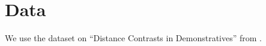 \documentclass[a4paper]{article}
\begin{document}
\section{Data}

We use the dataset on ``Distance Contrasts in Demonstratives'' from \cite{wals-41}.



\end{document}
